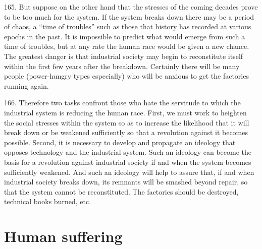 \documentclass{article}
\begin{document}
165.  But suppose on the other hand that the stresses of the coming decades prove to be too much 
for the system.  If the system breaks down there may be a period of chaos, a “time of troubles” 
such as those that history  has recorded at various epochs in the past.   It is impossible to predict 
what would emerge from such a time of troubles, but at any rate the human race would be given a 
new chance.  The greatest danger is that industrial society may begin to reconstitute itself within 
the first few years after the breakdown.  Certainly there will be many people (power-hungry types 
especially) who will be anxious to get the factories running again. \vspace{\baselineskip}

166.  Therefore two tasks confront those who hate the servitude to which the industrial system is 
reducing the human race.  First, we must work to heighten the social stresses within the system so 
as to increase the likelihood that it will break down or be weakened sufficiently so that a revolution 
against  it  becomes  possible.   Second,  it  is  necessary  to  develop  and  propagate  an  ideology  that  
opposes  technology  and  the  industrial  system.   Such  an  ideology  can  become  the  basis  for  a  
revolution against industrial society if and when the system becomes sufficiently weakened.  And 
such an ideology will help to assure that, if and when industrial society breaks down, its remnants 
will be smashed beyond repair, so that the system cannot be reconstituted.  The factories should 
be destroyed, technical books burned, etc. 


\section{Human suffering}
\end{document}
